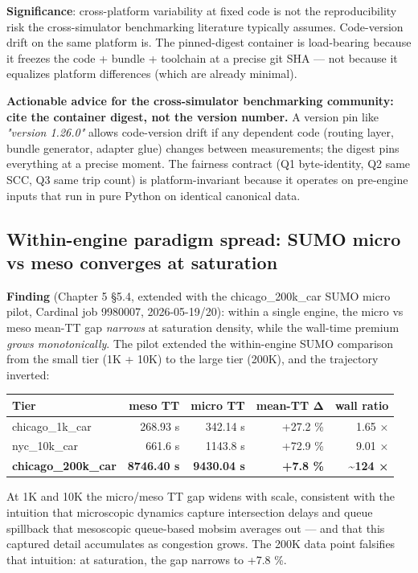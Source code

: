 \textbf{Significance}: cross-platform variability at fixed code is not
the reproducibility risk the cross-simulator benchmarking literature
typically assumes. Code-version drift on the same platform is. The
pinned-digest container is load-bearing because it freezes the code +
bundle + toolchain at a precise git SHA --- not because it equalizes
platform differences (which are already minimal).

\textbf{Actionable advice for the cross-simulator benchmarking
community: cite the container digest, not the version number.} A version
pin like \emph{"version 1.26.0"} allows code-version drift if any
dependent code (routing layer, bundle generator, adapter glue) changes
between measurements; the digest pins everything at a precise moment.
The fairness contract (Q1 byte-identity, Q2 same SCC, Q3 same trip
count) is platform-invariant because it operates on pre-engine inputs
that run in pure Python on identical canonical data.

\subsection{Within-engine paradigm spread: SUMO micro vs meso
converges at
saturation}\label{624-within-engine-paradigm-spread-sumo-micro-vs-meso-converges-at-saturation}

\textbf{Finding} (Chapter 5 §5.4, extended with the chicago\_200k\_car
SUMO micro pilot, Cardinal job 9980007, 2026-05-19/20): within a single
engine, the micro vs meso mean-TT gap \emph{narrows} at saturation
density, while the wall-time premium \emph{grows monotonically}. The
pilot extended the within-engine SUMO comparison from the small tier (1K
+ 10K) to the large tier (200K), and the trajectory inverted:

\begin{longtable}[]{@{}lrrrr@{}}
\toprule\noalign{}
Tier & meso TT & micro TT & mean-TT Δ & wall ratio \\
\midrule\noalign{}
\endhead
\bottomrule\noalign{}
\endlastfoot
chicago\_1k\_car & 268.93 s & 342.14 s & +27.2 \% & 1.65 × \\
nyc\_10k\_car & 661.6 s & 1143.8 s & +72.9 \% & 9.01 × \\
\textbf{chicago\_200k\_car} & \textbf{8746.40 s} & \textbf{9430.04 s} &
\textbf{+7.8 \%} & \textbf{\textasciitilde124 ×} \\
\end{longtable}

At 1K and 10K the micro/meso TT gap widens with scale, consistent with
the intuition that microscopic dynamics capture intersection delays and
queue spillback that mesoscopic queue-based mobsim averages out --- and
that this captured detail accumulates as congestion grows. The 200K data
point falsifies that intuition: at saturation, the gap narrows to +7.8
\%.

